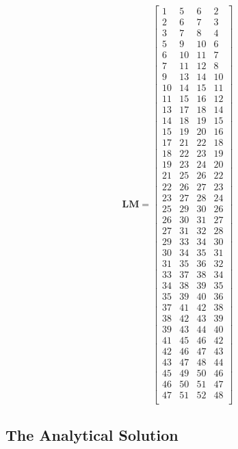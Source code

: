 \documentclass[10pt]{article}
\begin{document}
\begin{equation}
\textbf{LM}=
\begin{bmatrix}
1 & 5 & 6 & 2 \\
2 & 6 & 7 & 3 \\
3 & 7 & 8 & 4 \\
5 & 9 & 10 & 6 \\
6 & 10 & 11 & 7 \\
7 & 11 & 12 & 8 \\
9 & 13 & 14 & 10 \\
10 & 14 & 15 & 11 \\
11 & 15 & 16 & 12 \\
13 & 17 & 18 & 14 \\
14 & 18 & 19 & 15 \\
15 & 19 & 20 & 16 \\
17 & 21 & 22 & 18 \\
18 & 22 & 23 & 19 \\
19 & 23 & 24 & 20 \\
21 & 25 & 26 & 22 \\
22 & 26 & 27 & 23 \\
23 & 27 & 28 & 24 \\
25 & 29 & 30 & 26 \\
26 & 30 & 31 & 27 \\
27 & 31 & 32 & 28 \\
29 & 33 & 34 & 30 \\
30 & 34 & 35 & 31 \\
31 & 35 & 36 & 32 \\
33 & 37 & 38 & 34 \\
34 & 38 & 39 & 35 \\
35 & 39 & 40 & 36 \\
37 & 41 & 42 & 38 \\
38 & 42 & 43 & 39 \\
39 & 43 & 44 & 40 \\
41 & 45 & 46 & 42 \\
42 & 46 & 47 & 43 \\
43 & 47 & 48 & 44 \\
45 & 49 & 50 & 46 \\
46 & 50 & 51 & 47 \\
47 & 51 & 52 & 48 \\
\end{bmatrix}
\end{equation}

\subsection{The Analytical Solution}
\label{sec:Analytical1}
\end{document}
